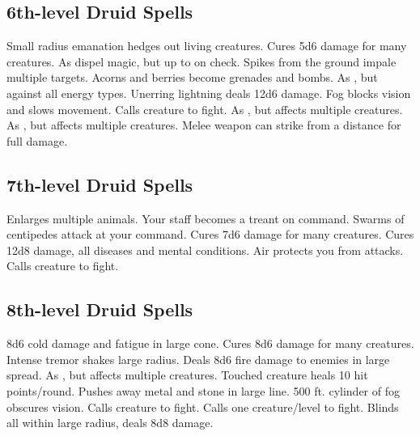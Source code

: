\subsection{6th-level Druid Spells}
\begin{spelllist}
   Small radius emanation hedges out living creatures.
   Cures 5d6 damage for many creatures.
   As dispel magic, but up to  on check.
   Spikes from the ground impale multiple targets.
   Acorns and berries become grenades and bombs.
   As , but against all energy types.
   Unerring lightning deals 12d6 damage.
   Fog blocks vision and slows movement.
   Calls creature to fight.
   As , but affects multiple creatures.
   As , but affects multiple creatures.
   Melee weapon can strike from a distance for full damage.
\end{spelllist}

\subsection{7th-level Druid Spells}
\begin{spelllist}
   Enlarges multiple animals.
   Your staff becomes a treant on command.
   Swarms of centipedes attack at your command.
   Cures 7d6 damage for many creatures.
   Cures 12d8 damage, all diseases and mental conditions.
   Air protects you from attacks. 
   Calls creature to fight.
\end{spelllist}

\subsection{8th-level Druid Spells}
\begin{spelllist}
   8d6 cold damage and fatigue in large cone.
   Cures 8d6 damage for many creatures.
   Intense tremor shakes large radius.
   Deals 8d6 fire damage to enemies in large spread.
   As , but affects multiple creatures.
   Touched creature heals 10 hit points/round.
   Pushes away metal and stone in large line.
   500 ft. cylinder of fog obscures vision.
   Calls creature to fight.
   Calls one creature/level to fight.
   Blinds all within large radius, deals 8d8 damage.
\end{spelllist}

